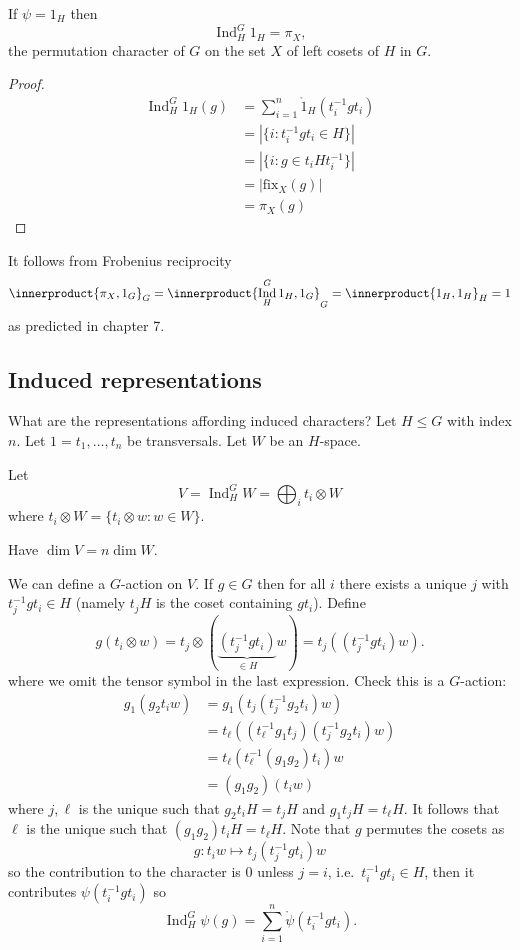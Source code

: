 \documentclass[a4paper]{article}
\newcommand*{\ip}{\innerproduct} %
\DeclareMathOperator{\Ind}{Ind} %
\theoremstyle{definition}
\begin{document}
\begin{lemma}
  If \(\psi = 1_H\) then
  \[
    \Ind_H^G 1_H = \pi_X,
  \]
  the permutation character of \(G\) on the set \(X\) of left cosets of \(H\) in \(G\).
\end{lemma}

\begin{proof}
  \begin{align*}
    \Ind_H^G 1_H(g)
    &= \sum_{i = 1}^n \ocirc 1_H(t_i^{-1} g t_i) \\
    &= |\{i: t_i^{-1} g t_i \in H\}| \\
    &= |\{i: g \in t_iHt_i^{-1}\}| \\
    &= |\text{fix}_X(g)| \\
    &= \pi_X (g)
  \end{align*}
\end{proof}

\begin{remark}
  It follows from Frobenius reciprocity
  \[
    \ip{\pi_X, 1_G}_G
    = \ip{\Ind_H^G 1_H, 1_G}_G
    = \ip{1_H, 1_H}_H
    = 1
  \]
  as predicted in chapter 7.
\end{remark}

\subsection{Induced representations}

What are the representations affording induced characters? Let \(H \leq G\) with index \(n\). Let \(1 = t_1, \dots, t_n\) be transversals. Let \(W\) be an \(H\)-space.

\begin{definition}
  Let
  \[
    V = \Ind_H^G W = \bigoplus_i t_i \otimes W
  \]
  where \(t_i \otimes W = \{t_i \otimes w: w \in W\}\).
\end{definition}
Have \(\dim V = n \dim W\).

We can define a \(G\)-action on \(V\). If \(g \in G\) then for all \(i\) there exists a unique \(j\) with \(t_j^{-1} g t_i \in H\) (namely \(t_j H\) is the coset containing \(gt_i\)). Define
\[
  g (t_i \otimes w)
  = t_j \otimes (\underbrace{(t_j^{-1} g t_i)}_{\in H} w)
  =  t_j ((t_j^{-1} g t_i) w).
\]
where we omit the tensor symbol in the last expression. Check this is a \(G\)-action:
\begin{align*}
  g_1(g_2 t_i w)
  &= g_1 (t_j (t_j^{-1} g_2 t_i)w) \\
  &= t_\ell ((t_\ell^{-1} g_1 t_j) (t_j^{-1} g_2 t_i) w) \\
  &= t_\ell (t_\ell^{-1} (g_1g_2)t_i)w \\
  &= (g_1g_2) (t_i w)
\end{align*}
where \(j, \ell\) is the unique such that \(g_2 t_i H = t_j H\) and \(g_1 t_jH = t_\ell H\). It follows that \(\ell\) is the unique such that \((g_1g_2) t_i H = t_\ell H\). Note that \(g\) permutes the cosets as
\[
  g: t_i w \mapsto t_j(t_j^{-1} g t_i)w
\]
so the contribution to the character is \(0\) unless \(j = i\), i.e.\ \(t_i^{-1}g t_i \in H\), then it contributes \(\psi(t_i^{-1}gt_i)\) so
\[
  \Ind_H^G \psi(g) = \sum_{i = 1}^n \ocirc \psi(t_i^{-1} gt_i).
\]
\end{document}
